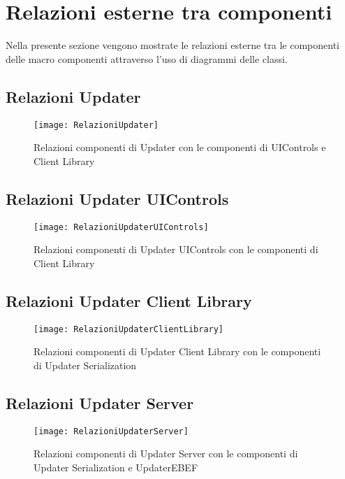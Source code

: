 \documentclass[../RelazioneFinale.tex]{subfiles}
\begin{document}
			
\newpage		
		
	\section{Relazioni esterne tra componenti}
		Nella presente sezione vengono mostrate le relazioni esterne tra le componenti delle macro componenti attraverso l'uso di diagrammi delle classi.
			
		\subsection{Relazioni Updater}
			\begin{figure}[h]
				\texttt{[image: RelazioniUpdater]}
				\label{fig:RelazioniUpdater}
				\caption{Relazioni componenti di Updater con le componenti di UIControls e Client Library}
			\end{figure}
			
\newpage
		\subsection{Relazioni Updater UIControls}
			\begin{figure}[h]
				\texttt{[image: RelazioniUpdaterUIControls]}
				\label{fig:RelazioniUpdaterUIControls}
				\caption{Relazioni componenti di Updater UIControls con le componenti di Client Library}
			\end{figure}
	
\newpage		
		\subsection{Relazioni Updater Client Library}
			\begin{figure}[h]
				\texttt{[image: RelazioniUpdaterClientLibrary]}
				\label{fig:RelazioniUpdaterClientLibrary}
				\caption{Relazioni componenti di Updater Client Library con le componenti di Updater Serialization}
			\end{figure}

\newpage			
		\subsection{Relazioni Updater Server}
			\begin{figure}[h]
				\texttt{[image: RelazioniUpdaterServer]}
				\label{fig:RelazioniUpdaterServer}
				\caption{Relazioni componenti di Updater Server con le componenti di Updater Serialization e UpdaterEBEF}
			\end{figure}
			
			
\end{document}

